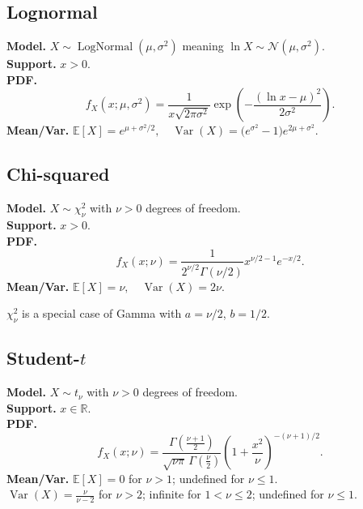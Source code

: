 \documentclass[
  letterpaper,
  DIV=11,
  numbers=noendperiod]{scrreprt}
\theoremstyle{definition}
\theoremstyle{plain}
\theoremstyle{definition}
\theoremstyle{remark}
\begin{document}
\subsection*{Lognormal}\label{sec-lognormal}

\textbf{Model.} \(X \sim \operatorname{LogNormal}(\mu,\sigma^2)\)
meaning \(\ln X \sim \mathcal{N}(\mu,\sigma^2)\).\\
\textbf{Support.} \(x>0\).\\
\textbf{PDF.} \[
f_X(x;\mu,\sigma^2)=\frac{1}{x\sqrt{2\pi\sigma^2}}
\exp\!\left(-\frac{(\ln x-\mu)^2}{2\sigma^2}\right).
\] \textbf{Mean/Var.}
\(\mathbb{E}[X]=e^{\mu+\sigma^2/2},\quad \operatorname{Var}(X)=\big(e^{\sigma^2}-1\big)e^{2\mu+\sigma^2}.\)

\subsection*{Chi-squared}\label{sec-chisq}

\textbf{Model.} \(X \sim \chi^2_\nu\) with \(\nu>0\) degrees of
freedom.\\
\textbf{Support.} \(x>0\).\\
\textbf{PDF.} \[
f_X(x;\nu)=\frac{1}{2^{\nu/2}\Gamma(\nu/2)}x^{\nu/2-1}e^{-x/2}.
\] \textbf{Mean/Var.}
\(\mathbb{E}[X]=\nu,\quad \operatorname{Var}(X)=2\nu.\)

\begin{tcolorbox}[enhanced jigsaw, left=2mm, toprule=.15mm, breakable, opacityback=0, titlerule=0mm, toptitle=1mm, colbacktitle=quarto-callout-note-color!10!white, colframe=quarto-callout-note-color-frame, coltitle=black, rightrule=.15mm, leftrule=.75mm, bottomrule=.15mm, arc=.35mm, bottomtitle=1mm, title=\textcolor{quarto-callout-note-color}{\faInfo}\hspace{0.5em}{Note}, colback=white, opacitybacktitle=0.6]

\(\chi^2_\nu\) is a special case of Gamma with \(a=\nu/2\), \(b=1/2\).

\end{tcolorbox}

\subsection*{\texorpdfstring{Student-\(t\)}{Student-t}}\label{sec-t}

\textbf{Model.} \(X \sim t_\nu\) with \(\nu>0\) degrees of freedom.\\
\textbf{Support.} \(x\in\mathbb{R}\).\\
\textbf{PDF.} \[
f_X(x;\nu)=\frac{\Gamma\!\left(\frac{\nu+1}{2}\right)}{\sqrt{\nu\pi}\,\Gamma\!\left(\frac{\nu}{2}\right)}
\left(1+\frac{x^2}{\nu}\right)^{-(\nu+1)/2}.
\] \textbf{Mean/Var.} \(\mathbb{E}[X]=0\) for \(\nu>1\); undefined for
\(\nu\le 1\).\\
\(\operatorname{Var}(X)=\frac{\nu}{\nu-2}\) for \(\nu>2\); infinite for
\(1<\nu\le 2\); undefined for \(\nu\le 1\).
\end{document}
